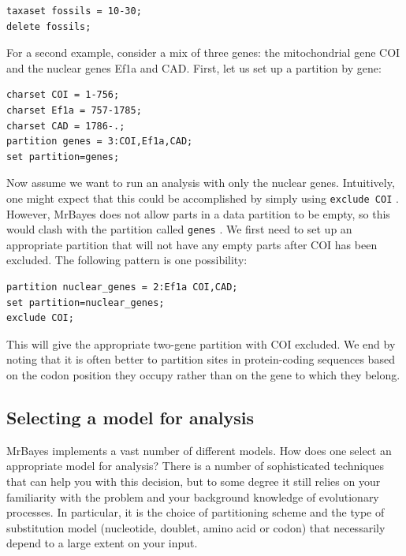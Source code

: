 \documentclass[12pt]{book}
\newcommand{\ttt}[1]{\texttt{#1} }
\begin{document}
\footnotesize
\begin{singlespacing}
\begin{verbatim}
taxaset fossils = 10-30;
delete fossils;
\end{verbatim}
\end{singlespacing}
\normalsize

For a second example, consider a mix of three genes: the mitochondrial gene COI and the nuclear
genes Ef1a and CAD. First, let us set up a partition by gene:

\footnotesize
\begin{singlespacing}
\begin{verbatim}
charset COI = 1-756;
charset Ef1a = 757-1785;
charset CAD = 1786-.;
partition genes = 3:COI,Ef1a,CAD;
set partition=genes;
\end{verbatim}
\end{singlespacing}
\normalsize

Now assume we want to run an analysis with only the nuclear genes. Intuitively, one might expect
that this could be accomplished by simply using \ttt{exclude COI}. However, MrBayes does not allow
parts in a data partition to be empty, so this would clash with the partition called \ttt{genes}.
We first need to set up an appropriate partition that will not have any empty parts after COI has
been excluded. The following pattern is one possibility:

\footnotesize
\begin{singlespacing}
\begin{verbatim}
partition nuclear_genes = 2:Ef1a COI,CAD;
set partition=nuclear_genes;
exclude COI;
\end{verbatim}
\end{singlespacing}
\normalsize

This will give the appropriate two-gene partition with COI excluded. We end by noting that it is
often better to partition sites in protein-coding sequences based on the codon position they occupy
rather than on the gene to which they belong.

\subsection{Selecting a model for analysis}

MrBayes implements a vast number of different models. How does one select an appropriate model for
analysis? There is a number of sophisticated techniques that can help you with this decision, but
to some degree it still relies on your familiarity with the problem and your background knowledge
of evolutionary processes.  In particular, it is the choice of partitioning scheme and the type of
substitution model (nucleotide, doublet, amino acid or codon) that necessarily depend to a large
extent on your input.
\end{document}
